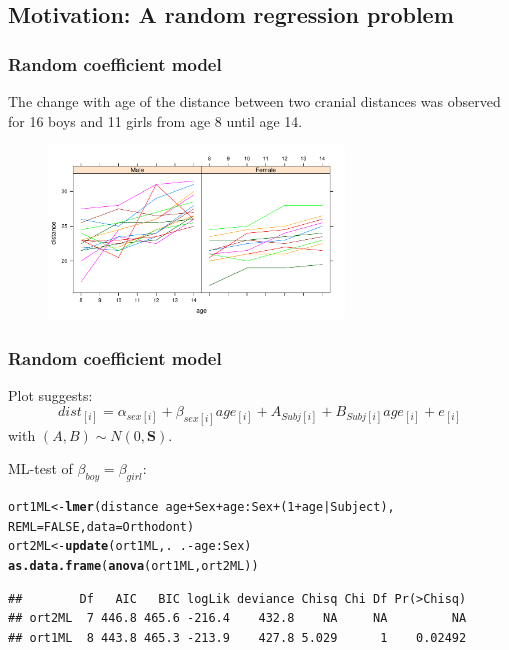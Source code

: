 \documentclass[compress]{beamer}\usepackage[]{graphicx}\usepackage[]{color}
\makeatletter
\newcommand{\hlnum}[1]{\textcolor[rgb]{0.686,0.059,0.569}{#1}}%
\newcommand{\hlopt}[1]{\textcolor[rgb]{0,0,0}{#1}}%
\newcommand{\hlstd}[1]{\textcolor[rgb]{0.345,0.345,0.345}{#1}}%
\newcommand{\hlkwb}[1]{\textcolor[rgb]{0.69,0.353,0.396}{#1}}%
\newcommand{\hlkwc}[1]{\textcolor[rgb]{0.333,0.667,0.333}{#1}}%
\newcommand{\hlkwd}[1]{\textcolor[rgb]{0.737,0.353,0.396}{\textbf{#1}}}%
\newenvironment{kframe}{%
 \def\at@end@of@kframe{}%
 \ifinner\ifhmode%
  \def\at@end@of@kframe{\end{minipage}}%
  \begin{minipage}{\columnwidth}%
 \fi\fi%
 \def\FrameCommand##1{\hskip\@totalleftmargin \hskip-\fboxsep
 \colorbox{shadecolor}{##1}\hskip-\fboxsep
     \hskip-\linewidth \hskip-\@totalleftmargin \hskip\columnwidth}%
 \MakeFramed {\advance\hsize-\width
   \@totalleftmargin\z@ \linewidth\hsize
   \@setminipage}}%
 {\par\unskip\endMakeFramed%
 \at@end@of@kframe}
\newenvironment{knitrout}{}{} %
\newenvironment{sframe}
{\begin{frame} [containsverbatim] }
  {\end{frame}}
\makeatother
\begin{document}
\subsection{Motivation: A random regression problem}
\begin{sframe}
  \frametitle{Random coefficient model}

  The change with age  of the distance between two cranial
distances was
observed for 16 boys and 11 girls
from age 8 until age 14.


\begin{figure}[ht]
 \centering
 \includegraphics[width=0.7\textwidth]{fig/ortfig01}\\[-0.5cm]
 \label{fig:ortfig01}
\end{figure}
\end{sframe}

\begin{sframe}
  \frametitle{Random coefficient model}
  Plot suggests:
\[
dist_{[i]} = \alpha_{sex[i]}
+ \beta_{sex[i]} age_{[i]} + A_{Subj[i]} +
B_{Subj[i]} age_{[i]} + e_{[i]}
\]
with $(A,B) \sim N(0,\bm S)$.

ML-test of $\beta_{boy}=\beta_{girl}$:
\begin{knitrout}\tiny
{}\color{fgcolor}\begin{kframe}
\begin{alltt}
\hlstd{ort1ML}\hlkwb{<-} \hlkwd{lmer}\hlstd{(distance} \hlopt{~} \hlstd{age} \hlopt{+} \hlstd{Sex} \hlopt{+} \hlstd{age}\hlopt{:}\hlstd{Sex} \hlopt{+} \hlstd{(}\hlnum{1} \hlopt{+} \hlstd{age} \hlopt{|} \hlstd{Subject),}
                  \hlkwc{REML} \hlstd{=} \hlnum{FALSE}\hlstd{,} \hlkwc{data}\hlstd{=Orthodont)}
\hlstd{ort2ML}\hlkwb{<-} \hlkwd{update}\hlstd{(ort1ML, .}\hlopt{~}\hlstd{.} \hlopt{-} \hlstd{age}\hlopt{:}\hlstd{Sex)}
\hlkwd{as.data.frame}\hlstd{(}\hlkwd{anova}\hlstd{(ort1ML, ort2ML))}
\end{alltt}
\begin{verbatim}
##        Df   AIC   BIC logLik deviance Chisq Chi Df Pr(>Chisq)
## ort2ML  7 446.8 465.6 -216.4    432.8    NA     NA         NA
## ort1ML  8 443.8 465.3 -213.9    427.8 5.029      1    0.02492
\end{verbatim}
\end{kframe}
\end{knitrout}
\end{sframe}
\end{document}
